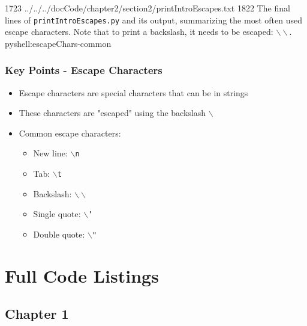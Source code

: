 \documentclass[oneside]{book}
\begin{document}
{17}{23}
{../../../docCode/chapter2/section2/printIntroEscapes.txt}
{18}{22}
{The final lines of \texttt{printIntroEscapes.py} and its output, summarizing the most often used escape characters. Note that to print a backslash, it needs to be escaped: $\backslash\backslash$.}
{pyshell:escapeChars-common}

\FloatBarrier

\subsubsection*{Key Points - Escape Characters}
\begin{itemize}
    \item Escape characters are special characters that can be in strings
    \item These characters are "escaped" using the backslash \texttt{$\backslash$}
    \item Common escape characters:
    \begin{itemize}
        \item New line: \texttt{$\backslash$n}
        \item Tab: \texttt{$\backslash$t}
        \item Backslash: \texttt{$\backslash\backslash$}
        \item Single quote: \texttt{$\backslash$'}
        \item Double quote: \texttt{$\backslash$"}
    \end{itemize}
\end{itemize}


\section{Full Code Listings}

\subsection*{Chapter 1}


\FloatBarrier
\end{document}
